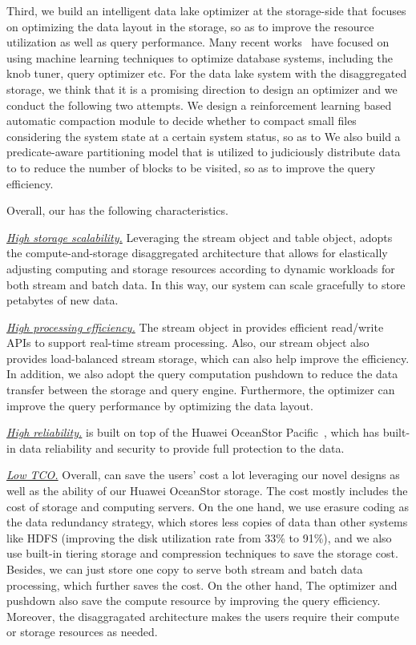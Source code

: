 Third,  we build an intelligent data lake optimizer \brain at the storage-side that focuses on optimizing the data layout in the storage, so as to improve the resource utilization as well as  query performance. Many recent works~\cite{}  have focused on using machine learning techniques to  optimize database systems, including the knob tuner, query optimizer etc. For the data lake system with the disaggregated storage, we think that it is a promising direction to design an optimizer and we conduct the following two attempts.
 We design a reinforcement learning based automatic compaction module  to decide whether to compact small files considering the system state at a certain system status, so as to  We also build a predicate-aware partitioning model that is utilized to judiciously distribute data to  to reduce the number of blocks to be visited, so as to improve the query efficiency.  

Overall, our \sys has the following characteristics.

\noindent \underline{\textit{High storage scalability.}} Leveraging the stream object and table object, \sys adopts the compute-and-storage disaggregated architecture that allows for elastically adjusting computing and storage resources according to  dynamic workloads  for both stream and batch data. In this way, our system can  scale gracefully to store petabytes of new data.

\noindent \underline{\textit{High processing efficiency.}} The  stream object in \sys provides efficient read/write APIs to support real-time stream processing. Also, our stream object also provides load-balanced stream storage, which can also help  improve the efficiency. In addition, we also  adopt the query computation pushdown to reduce the data transfer between the storage and query engine. Furthermore, the \brain optimizer can improve the query performance by optimizing the data layout. 

\noindent \underline{\textit{High reliability.}} \sys is built on top of the Huawei OceanStor Pacific~\cite{}, which has built-in data reliability and security to provide full protection to the data.

\noindent \underline{\textit{Low TCO.}} Overall, \sys can save the users' cost a lot leveraging  our novel designs as well as the ability of our Huawei OceanStor storage. The cost mostly includes the cost of  storage and computing servers. 
On the one hand, we use erasure coding as the data redundancy strategy, which stores less copies of data than other systems like HDFS (improving the disk utilization rate from 33\% to 91\%), and we also use built-in tiering storage and  compression techniques to save the storage cost. Besides, we can just store one copy to serve both  stream and batch data processing, which  further saves the cost.
On the other hand,  The \brain optimizer and  pushdown also  save the compute resource by improving the query efficiency. Moreover, the disaggragated architecture makes the users require their compute or storage resources as needed. 


